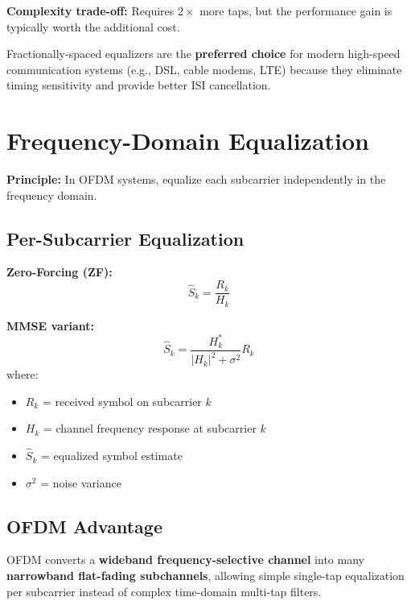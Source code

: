 \textbf{Complexity trade-off:} Requires $2\times$ more taps, but the performance gain is typically worth the additional cost.

\begin{keyconcept}
Fractionally-spaced equalizers are the \textbf{preferred choice} for modern high-speed communication systems (e.g., DSL, cable modems, LTE) because they eliminate timing sensitivity and provide better ISI cancellation.
\end{keyconcept}

\section{Frequency-Domain Equalization}
\label{sec:freq-domain-eq}

\textbf{Principle:} In OFDM systems, equalize each subcarrier independently in the frequency domain.

\subsection{Per-Subcarrier Equalization}

\textbf{Zero-Forcing (ZF):}
\begin{equation}
\hat{S}_k = \frac{R_k}{H_k}
\label{eq:ofdm-zf}
\end{equation}

\textbf{MMSE variant:}
\begin{equation}
\hat{S}_k = \frac{H_k^*}{|H_k|^2 + \sigma^2} R_k
\label{eq:ofdm-mmse}
\end{equation}
where:
\begin{itemize}
\item $R_k$ = received symbol on subcarrier $k$
\item $H_k$ = channel frequency response at subcarrier $k$
\item $\hat{S}_k$ = equalized symbol estimate
\item $\sigma^2$ = noise variance
\end{itemize}

\subsection{OFDM Advantage}

\begin{keyconcept}
OFDM converts a \textbf{wideband frequency-selective channel} into many \textbf{narrowband flat-fading subchannels}, allowing simple single-tap equalization per subcarrier instead of complex time-domain multi-tap filters.
\end{keyconcept}

